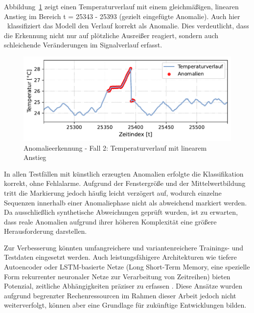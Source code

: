 Abbildung~\ref{fig:Fall2} zeigt einen Temperaturverlauf mit einem gleichmäßigen, linearen Anstieg im Bereich t = 25343 - 25393 (gezielt eingefügte Anomalie).
Auch hier%
\pagebreak
~klassifiziert das Modell den Verlauf korrekt als Anomalie. 
Dies verdeutlicht, dass die Erkennung nicht nur auf plötzliche Ausreißer reagiert, sondern auch schleichende Veränderungen im Signalverlauf erfasst.

\vspace{-0.5em}
\begin{figure}[htbp]
    \centering
        \includegraphics[width=1\textwidth]{Bilder/Ergebnisse/KI/Fall2.pdf}
        \vspace{-2em}
    \caption[Anomalieerkennung - Fall 2]{Anomalieerkennung - Fall 2: Temperaturverlauf mit linearem Anstieg}
    \label{fig:Fall2}
\end{figure}
\vspace{-0.5em}

In allen Testfällen mit künstlich erzeugten Anomalien erfolgte die Klassifikation korrekt, ohne Fehlalarme. 
Aufgrund der Fenstergröße und der Mittelwertbildung tritt die Markierung jedoch häufig leicht verzögert auf, wodurch einzelne Sequenzen innerhalb einer Anomaliephase nicht als abweichend markiert werden. 
Da ausschließlich synthetische Abweichungen geprüft wurden, ist zu erwarten, dass reale Anomalien aufgrund ihrer höheren Komplexität eine größere Herausforderung darstellen.

Zur Verbesserung könnten umfangreichere und variantenreichere Trainings- und Testdaten eingesetzt werden. 
Auch leistungsfähigere Architekturen wie tiefere Autoencoder oder LSTM-basierte Netze (Long Short-Term Memory, eine spezielle Form rekurrenter neuronaler Netze zur Verarbeitung von Zeitreihen) bieten Potenzial, zeitliche Abhängigkeiten präziser zu erfassen \cite{MALEKI2021107443}. 
Diese Ansätze wurden aufgrund begrenzter Rechenressourcen im Rahmen dieser Arbeit jedoch nicht weiterverfolgt, können aber eine Grundlage für zukünftige Entwicklungen bilden.

